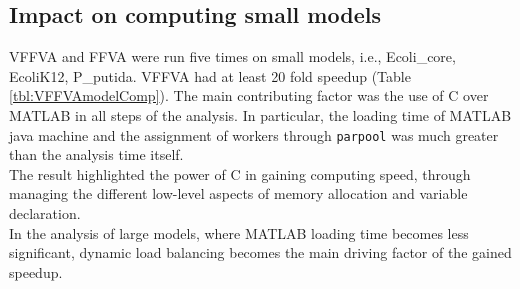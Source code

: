 \subsection*{Impact on computing small models}
VFFVA and FFVA were run five times on small models, i.e., Ecoli\_core, EcoliK12, P\_putida. VFFVA had at least 20 fold speedup (Table \ref{tbl:VFFVAmodelComp}). The main contributing factor was the use of C over MATLAB in all steps of the analysis. In particular, the loading time of MATLAB java machine and the assignment of workers through \texttt{parpool} was much greater than the analysis time itself.\\
The result highlighted the power of C in gaining computing speed, through managing the different low-level aspects of memory allocation and variable declaration.\\
In the analysis of large models, where MATLAB loading time becomes less significant, dynamic load balancing becomes the main driving factor of the gained speedup.\\ 
